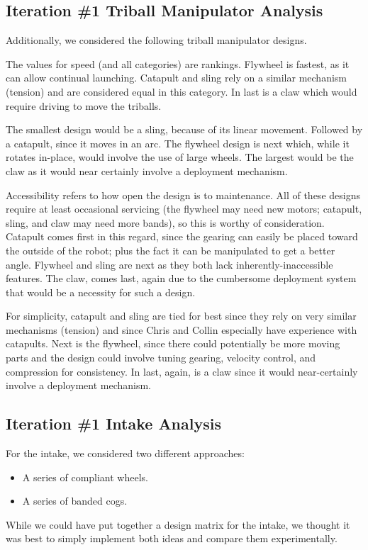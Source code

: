 \subsection{Iteration \#1 Triball Manipulator Analysis}
Additionally, we considered the following triball manipulator designs.
\par The values for speed (and all categories) are rankings. Flywheel is
fastest, as it can allow continual launching. Catapult and sling rely on a
similar mechanism (tension) and are considered equal in this category. In last
is a claw which would require driving to move the triballs. \par The smallest
design would be a sling, because of its linear movement. Followed by a catapult,
since it moves in an arc. The flywheel design is next which, while it rotates
in-place, would involve the use of large wheels. The largest would be the claw
as it would near certainly involve a deployment mechanism. \par Accessibility
refers to how open the design is to maintenance. All of these designs require at
least occasional servicing (the flywheel may need new motors; catapult, sling,
and claw may need more bands), so this is worthy of consideration. Catapult
comes first in this regard, since the gearing can easily be placed toward the
outside of the robot; plus the fact it can be manipulated to get a better angle.
Flywheel and sling are next as they both lack inherently-inaccessible features.
The claw, comes last, again due to the cumbersome deployment system that would
be a necessity for such a design. \par For simplicity, catapult and sling are
tied for best since they rely on very similar mechanisms (tension) and since
Chris and Collin especially have experience with catapults. Next is the
flywheel, since there could potentially be more moving parts and the design
could involve tuning gearing, velocity control, and compression for consistency.
In last, again, is a claw since it would near-certainly involve a deployment
mechanism.

\subsection{Iteration \#1 Intake Analysis}
For the intake, we considered two different approaches:
\begin{itemize}
      \item A series of compliant wheels.
      \item A series of banded cogs.
\end{itemize}
While we could have put together a design matrix for the intake, we thought it
was best to simply implement both ideas and compare them experimentally.

